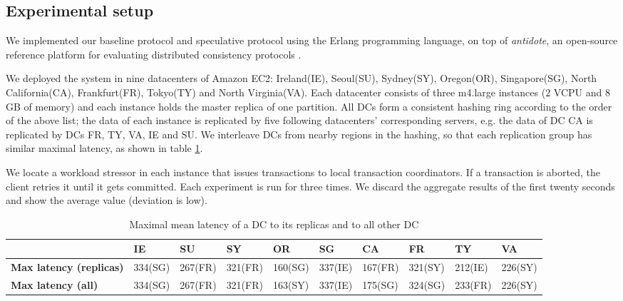 \subsection{Experimental setup}
\label{subsec:setup}
We implemented our baseline protocol and speculative protocol using the Erlang programming language, on top of \textit{antidote}, an open-source reference platform for evaluating distributed consistency protocols \cite{antidote}.

We deployed the system in nine datacenters of Amazon EC2: Ireland(IE), Seoul(SU), Sydney(SY), Oregon(OR), Singapore(SG), North California(CA), Frankfurt(FR), Tokyo(TY) and North Virginia(VA). Each datacenter consists of three m4.large instances (2 VCPU and 8 GB of memory) and each instance holds the master replica of one partition. All DCs form a consistent hashing ring according to the order of the above list; the data of each instance is replicated by five following datacenters' corresponding servers, e.g. the data of DC CA is replicated by DCs FR, TY, VA, IE and SU. We interleave DCs from nearby regions in the hashing, so that each replication group has similar maximal latency, as shown in table \ref{tab:latency}.

We locate a workload stressor in each instance that issues transactions to local transaction coordinators. If a transaction is aborted, the client retries it until it gets committed. Each experiment is run for three times. We discard the aggregate results of the first twenty seconds and show the average value (deviation is low).

\begin{table}
\small
\begin{center}
  \begin{tabular}{l |  l | l | l| l | l | l| l| l |l } 
     & IE & SU& SY& OR & SG & CA &  FR & TY & VA  \\ \hline
  \textbf{Max latency (replicas)} & 334(SG) & 267(FR) & 321(FR) & 160(SG)  & 337(IE) & 167(FR) & 321(SY)& 212(IE)  &  226(SY)  \\   \hline
  \textbf{Max latency (all)} &  334(SG) &  267(FR) & 321(FR)  & 163(SY) & 337(IE) & 175(SG) & 324(SG)  & 233(FR)  & 226(SY) \\ \hline
  \end{tabular}
\end{center}
\caption{Maximal mean latency of a DC to its replicas and to all other DC}
\label{tab:latency}
\end{table}


